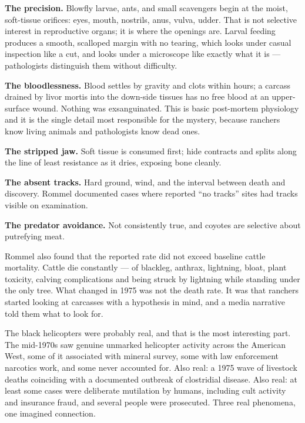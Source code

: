 \textbf{The precision.} Blowfly larvae, ants, and small scavengers begin at the moist,
soft-tissue orifices: eyes, mouth, nostrils, anus, vulva, udder. That is not selective interest in
reproductive organs; it is where the openings are. Larval feeding produces a smooth, scalloped
margin with no tearing, which looks under casual inspection like a cut, and looks under a
microscope like exactly what it is --- pathologists distinguish them without difficulty.

\textbf{The bloodlessness.} Blood settles by gravity and clots within hours; a carcass drained
by livor mortis into the down-side tissues has no free blood at an upper-surface wound. Nothing
was exsanguinated. This is basic post-mortem physiology and it is the single detail most
responsible for the mystery, because ranchers know living animals and pathologists know dead ones.

\textbf{The stripped jaw.} Soft tissue is consumed first; hide contracts and splits along the
line of least resistance as it dries, exposing bone cleanly.

\textbf{The absent tracks.} Hard ground, wind, and the interval between death and discovery.
Rommel documented cases where reported ``no tracks'' sites had tracks visible on examination.

\textbf{The predator avoidance.} Not consistently true, and coyotes are selective about
putrefying meat.

Rommel also found that the reported rate did not exceed baseline cattle mortality. Cattle die
constantly --- of blackleg, anthrax, lightning, bloat, plant toxicity, calving complications and
being struck by lightning while standing under the only tree. What changed in 1975 was not the
death rate. It was that ranchers started looking at carcasses with a hypothesis in mind, and a
media narrative told them what to look for.

\begin{funfact}
The black helicopters were probably real, and that is the most interesting part. The mid-1970s
saw genuine unmarked helicopter activity across the American West, some of it associated with
mineral survey, some with law enforcement narcotics work, and some never accounted for. Also real:
a 1975 wave of livestock deaths coinciding with a documented outbreak of clostridial disease.
Also real: at least some cases were deliberate mutilation by humans, including cult activity and
insurance fraud, and several people were prosecuted. Three real phenomena, one imagined
connection.
\end{funfact}

